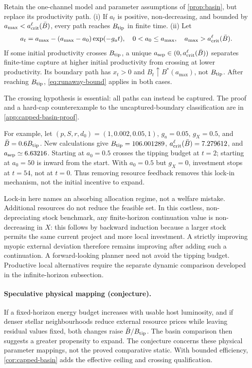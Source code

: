 \begin{corollary}
\label{cor:capped-basin}
Retain the one-channel model and parameter assumptions of \cref{prop:basin},
but replace its productivity path.
(i) If $a_t$ is positive, non-decreasing, and bounded by
$a_{\max}<a_{\rm crit}^{\ell}(\bar B)$, every path reaches
$B_{\rm tip}$ in finite time.
(ii) Let
\begin{equation}
 a_t=a_{\max}-(a_{\max}-a_0)\exp(-g_at),\quad
 0<a_0\leq a_{\max},\quad a_{\max}>a_{\rm crit}^{\ell}(\bar B).
 \label{eq:saturating-productivity}
\end{equation}
If some initial productivity crosses $B_{\rm tip}$, a unique
$a_{\rm sep}\in(0,a_{\rm crit}^{\ell}(\bar B))$ separates finite-time
capture at higher initial productivity from crossing at lower productivity.
Its boundary path has $x_t>0$ and
$B_t\uparrow B^*(a_{\max})$, not $B_{\rm tip}$.
After reaching $B_{\rm tip}$, \cref{eq:runaway-bound} applies in both cases.
\end{corollary}
The crossing hypothesis is essential: all paths can instead be captured.
The proof and a hard-cap counterexample to the uncaptured-boundary
classification are in \cref{app:capped-basin-proof}.

For example, let $(p,S,r,d_0)=(1,0.002,0.05,1)$,
$g_a=0.05$, $g_X=0.5$, and $\bar B=0.6B_{\rm tip}$. New calculations
give $B_{\rm tip}=106.001289$,
$a_{\rm crit}^{\ell}(\bar B)=7.279612$, and
$a_{\rm sep}\simeq6.63216$. Starting at $a_0=0.5$ crosses the tipping
budget at $t=2$; starting at $a_0=50$ is inward from the start. With
$a_0=0.5$ but $g_X=0$, investment stops at $t=54$, not at $t=0$.
Thus removing resource feedback removes this lock-in mechanism, not
the initial incentive to expand.

Lock-in here names an absorbing allocation regime, not a welfare
mistake. Additional resources do not reduce the feasible set. In this
costless, non-depreciating stock benchmark, any finite-horizon
continuation value is non-decreasing in $X$: this follows by backward
induction because a larger stock permits the same current project and
more local investment. A strictly improving myopic external deviation
therefore remains improving after adding such a continuation. A
forward-looking planner need not avoid the tipping budget. Productive
local alternatives require the separate dynamic comparison developed
in the infinite-horizon subsection.

\paragraph{Speculative physical mapping (conjecture).}
If a fixed-horizon energy budget increases with usable host luminosity,
and if denser stellar neighbourhoods reduce external resource prices
while leaving residual values fixed, both changes raise
$\bar B/B_{\rm tip}$. The basin comparison then suggests a greater
propensity to expand. The conjecture concerns these physical parameter
mappings, not the proved comparative static. With bounded efficiency,
\cref{cor:capped-basin} adds the effective ceiling and crossing qualification.

